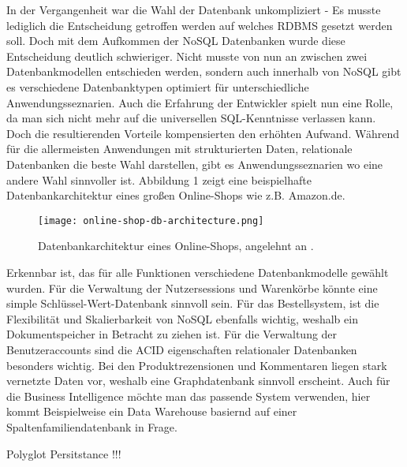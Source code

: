 In der Vergangenheit war die Wahl der Datenbank unkompliziert - Es musste lediglich die Entscheidung getroffen werden auf welches RDBMS gesetzt werden soll. Doch mit dem Aufkommen der NoSQL Datenbanken wurde diese Entscheidung deutlich schwieriger. Nicht musste von nun an zwischen zwei Datenbankmodellen entschieden werden, sondern auch innerhalb von NoSQL gibt es verschiedene Datenbanktypen optimiert für unterschiedliche Anwendungsseznarien. Auch die Erfahrung der Entwickler spielt nun eine Rolle, da man sich nicht mehr auf die universellen SQL-Kenntnisse verlassen kann. Doch die resultierenden Vorteile kompensierten den erhöhten Aufwand. Während für die allermeisten Anwendungen mit strukturierten Daten, relationale Datenbanken die beste Wahl darstellen, gibt es Anwendungsseznarien wo eine andere Wahl sinnvoller ist. Abbildung 1 zeigt eine beispielhafte Datenbankarchitektur eines großen Online-Shops wie z.B. Amazon.de.

\begin{figure}[H]
    \centering
    \texttt{[image: online-shop-db-architecture.png]}
    \caption{Datenbankarchitektur eines Online-Shops, angelehnt an \cite{donofrioBigDataAnalytics2021}.}
\end{figure}

Erkennbar ist, das für alle Funktionen verschiedene Datenbankmodelle gewählt wurden. Für die Verwaltung der Nutzersessions und Warenkörbe könnte eine simple Schlüssel-Wert-Datenbank sinnvoll sein. Für das Bestellsystem, ist die Flexibilität und Skalierbarkeit von NoSQL ebenfalls wichtig, weshalb ein Dokumentspeicher in Betracht zu ziehen ist. Für die Verwaltung der Benutzeraccounts sind die ACID eigenschaften relationaler Datenbanken besonders wichtig. Bei den Produktrezensionen und Kommentaren liegen stark vernetzte Daten vor, weshalb eine Graphdatenbank sinnvoll erscheint. Auch für die Business Intelligence möchte man das passende System verwenden, hier kommt Beispielweise ein Data Warehouse basiernd auf einer Spaltenfamiliendatenbank in Frage.

Polyglot Persitstance !!! 